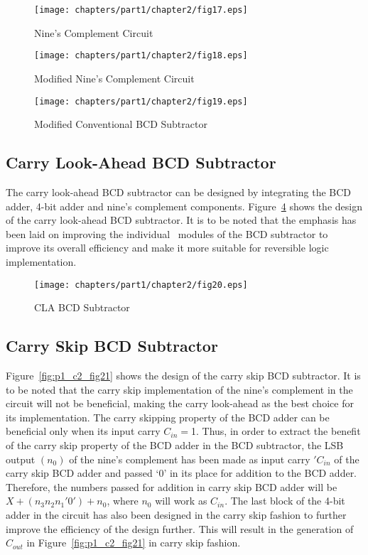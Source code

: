 \begin{figure}[!tbh]
\centering
\texttt{[image: chapters/part1/chapter2/fig17.eps]}
\caption{Nine's Complement Circuit}
\label{fig:p1_c2_fig17}
\end{figure}


\begin{figure}[!tbh]
\centering
\texttt{[image: chapters/part1/chapter2/fig18.eps]}
\caption{Modified Nine's Complement Circuit}
\label{fig:p1_c2_fig18}
\end{figure}

\begin{figure}[!tbh]
\centering
\texttt{[image: chapters/part1/chapter2/fig19.eps]}
\caption{Modified Conventional BCD Subtractor}
\label{fig:p1_c2_fig19}
\end{figure}

\subsection{Carry Look-Ahead BCD Subtractor}

The carry look-ahead BCD subtractor can be designed by integrating the BCD adder, 4-bit adder and nine's complement components. Figure~\ref{fig:p1_c2_fig20} shows the design of the carry look-ahead BCD subtractor. It is to be noted that the emphasis has been laid on improving the individual~ modules of the BCD subtractor to improve its overall efficiency and make it more suitable for reversible logic implementation.

\begin{figure}[!tbh]
\centering
\texttt{[image: chapters/part1/chapter2/fig20.eps]}
\caption{CLA BCD Subtractor}
\label{fig:p1_c2_fig20}
\end{figure}

\subsection{Carry Skip BCD Subtractor}

Figure~\ref{fig:p1_c2_fig21} shows the design of the carry skip BCD subtractor. It is to be noted that the carry skip implementation of the nine's complement in the circuit will not be beneficial, making the carry look-ahead as the best choice for its implementation. The carry skipping property of the BCD adder can be beneficial only when its input carry $C_{in}=$1. Thus, in order to extract the benefit of the carry skip property of the BCD adder in the BCD subtractor, the LSB output $(n_0)$ of the nine's complement has been made as input carry $'C_{in}$ of the carry skip BCD adder and passed `0' in its place for addition to the BCD adder. Therefore, the numbers passed for addition in carry skip BCD adder will be $X+(n_3 n_2 n_1'0')+n_0$, where $n_0$ will work as $C_{in}$. The last block of the 4-bit adder in the circuit has also been designed in the carry skip fashion to further improve the efficiency of the design further. This will result in the generation of $C_{out}$ in Figure~\ref{fig:p1_c2_fig21} in carry skip fashion.



